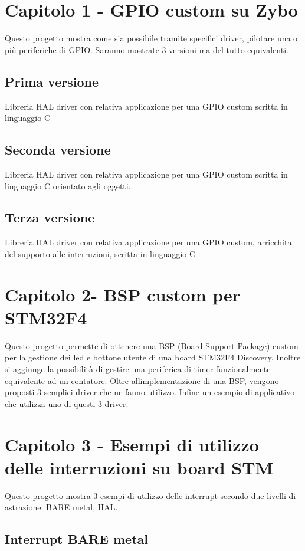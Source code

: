 \hypertarget{index_firstintro}{}\section{Capitolo 1  -\/ G\+P\+I\+O custom su Zybo}\label{index_firstintro}
Questo progetto mostra come sia possibile tramite specifici driver, pilotare una o più periferiche di G\+P\+IO. Saranno mostrate 3 versioni ma del tutto equivalenti. \hypertarget{index_firstfirst}{}\subsection{Prima versione}\label{index_firstfirst}
Libreria H\+AL driver con relativa applicazione per una G\+P\+IO custom scritta in linguaggio C\hypertarget{index_firstsecond}{}\subsection{Seconda versione}\label{index_firstsecond}
Libreria H\+AL driver con relativa applicazione per una G\+P\+IO custom scritta in linguaggio C orientato agli oggetti.\hypertarget{index_firsttirht}{}\subsection{Terza versione}\label{index_firsttirht}
Libreria H\+AL driver con relativa applicazione per una G\+P\+IO custom, arricchita del supporto alle interruzioni, scritta in linguaggio C\hypertarget{index_second}{}\section{Capitolo 2-\/ B\+S\+P custom per S\+T\+M32\+F4}\label{index_second}
Questo progetto permette di ottenere una B\+SP (Board Support Package) custom per la gestione dei led e bottone utente di una board S\+T\+M32\+F4 Discovery. Inoltre si aggiunge la possibilità di gestire una periferica di timer funzionalmente equivalente ad un contatore. Oltre all\textquotesingle{}implementazione di una B\+SP, vengono proposti 3 semplici driver che ne fanno utilizzo. Infine un esempio di applicativo che utilizza uno di questi 3 driver.\hypertarget{index_tirth}{}\section{Capitolo 3 -\/ Esempi di utilizzo delle interruzioni su board S\+TM}\label{index_tirth}
Questo progetto mostra 3 esempi di utilizzo delle interrupt secondo due livelli di astrazione\+: B\+A\+RE metal, H\+AL. \hypertarget{index_thirtfirst}{}\subsection{Interrupt B\+A\+R\+E metal}\label{index_thirtfirst}
